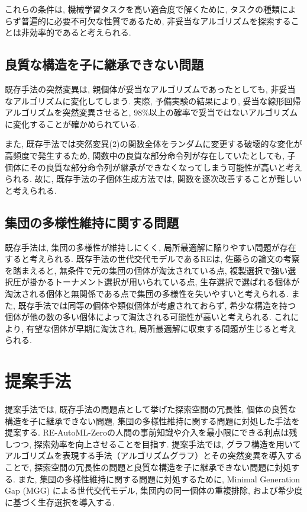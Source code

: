 \documentclass[a4paper,11pt,twocolumn]{jarticle}
\begin{document}
\noindent
これらの条件は, 機械学習タスクを高い適合度で解くために, タスクの種類によらず普遍的に必要不可欠な性質であるため, 非妥当なアルゴリズムを探索することは非効率的であると考えられる.

\subsection{良質な構造を子に継承できない問題}\label{subsec:existing_problem:mutation}

既存手法の突然変異は, 親個体が妥当なアルゴリズムであったとしても, 非妥当なアルゴリズムに変化してしまう. 実際, 予備実験の結果により, 妥当な線形回帰アルゴリズムを突然変異させると, 98\%以上の確率で妥当ではないアルゴリズムに変化することが確かめられている.

また, 既存手法では突然変異(2)の関数全体をランダムに変更する破壊的な変化が高頻度で発生するため, 関数中の良質な部分命令列が存在していたとしても, 子個体にその良質な部分命令列が継承ができなくなってしまう可能性が高いと考えられる. 故に, 既存手法の子個体生成方法では, 関数を逐次改善することが難しいと考えられる.

\subsection{集団の多様性維持に関する問題}\label{subsec:existing_problem:diversity}

既存手法は, 集団の多様性が維持しにくく, 局所最適解に陥りやすい問題が存在すると考えられる. 既存手法の世代交代モデルであるREは, 佐藤らの論文\cite{mgg}の考察を踏まえると, 無条件で元の集団の個体が淘汰されている点, 複製選択で強い選択圧が掛かるトーナメント選択が用いられている点, 生存選択で選ばれる個体が淘汰される個体と無関係である点で集団の多様性を失いやすいと考えられる. また, 既存手法では同等の個体や類似個体が考慮されておらず, 希少な構造を持つ個体が他の数の多い個体によって淘汰される可能性が高いと考えられる. これにより, 有望な個体が早期に淘汰され, 局所最適解に収束する問題が生じると考えられる.

\section{提案手法} \label{sec:proposed_method}

提案手法では, 既存手法の問題点として挙げた探索空間の冗長性, 個体の良質な構造を子に継承できない問題, 集団の多様性維持に関する問題に対処した手法を提案する. RE-AutoML-Zeroの人間の事前知識や介入を最小限にできる利点は残しつつ, 探索効率を向上させることを目指す. 提案手法では, グラフ構造を用いてアルゴリズムを表現する手法（アルゴリズムグラフ）とその突然変異を導入することで, 探索空間の冗長性の問題と良質な構造を子に継承できない問題に対処する. また, 集団の多様性維持に関する問題に対処するために, Minimal Generation Gap (MGG) \cite{mgg}による世代交代モデル, 集団内の同一個体の重複排除, および希少度に基づく生存選択を導入する.
\end{document}
